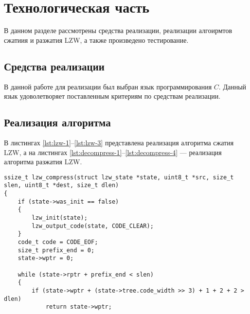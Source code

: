 \chapter{Технологическая часть}

В данном разделе рассмотрены средства реализации, реализации алгоирмтов сжатиия и разжатия LZW, а также произведено тестирование.

\section{Средства реализации}
В данной работе для реализации был выбран язык программирования $C$. Данный язык удоволетворяет поставленным критериям по средствам реализации.

\section{Реализация алгоритма}

В листингах \ref{lst:lzw-1}--\ref{lst:lzw-3} представлена реализация алгоритма сжатия LZW, а на листингах \ref{lst:decompress-1}--\ref{lst:decompress-4} --- реализация алгоритма разжатия LZW.

\begin{center}
    \captionsetup{justification=raggedright,singlelinecheck=off}
    \begin{lstlisting}[label=lst:lzw-1,caption=Реализация алгоритма сжатия LZW (часть 1)]
ssize_t lzw_compress(struct lzw_state *state, uint8_t *src, size_t slen, uint8_t *dest, size_t dlen) 
{
	if (state->was_init == false) 
	{
		lzw_init(state);
		lzw_output_code(state, CODE_CLEAR);
	}
	code_t code = CODE_EOF;
	size_t prefix_end = 0;
	state->wptr = 0;

	while (state->rptr + prefix_end < slen) 
	{
		if (state->wptr + (state->tree.code_width >> 3) + 1 + 2 + 2 > dlen) 
			return state->wptr;
\end{lstlisting}
\end{center}


